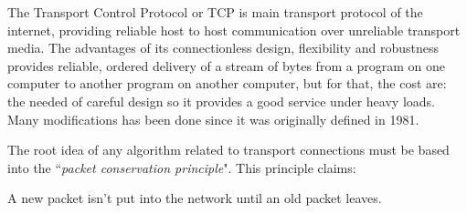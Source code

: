 
The Transport Control Protocol or TCP is main transport protocol of the
internet, providing reliable host to host communication over unreliable
transport media\cite{rfc793}. The advantages of its connectionless design,
flexibility and robustness provides reliable, ordered delivery of a stream of
bytes from a program on one computer to another program on another computer,
but for that, the cost are: the needed of careful design so it provides a good
service under heavy loads. Many modifications has been done since it was
originally defined in 1981.

The root idea of any algorithm related to transport connections must be based
into the ``\textit{packet conservation principle}". This principle claims:

\begin{defn}
A new packet isn't put into the network until an old packet leaves.
\end{defn}
